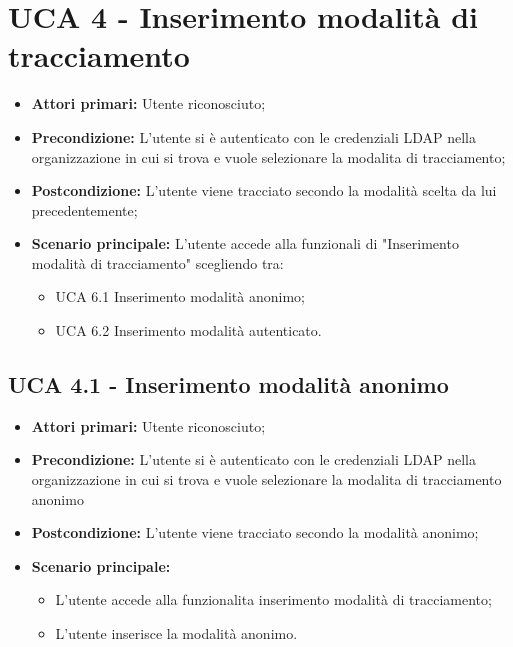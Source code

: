 \newpage
\section{UCA 4 - Inserimento modalità di tracciamento}%
\begin{itemize}
	\item \textbf{Attori primari:} Utente riconosciuto;
	\item \textbf{Precondizione:} L'utente si è autenticato con le credenziali LDAP nella organizzazione in cui si trova e vuole selezionare la modalita di tracciamento;
	\item \textbf{Postcondizione:} L'utente viene tracciato secondo la modalità scelta da lui precedentemente; 
	\item \textbf{Scenario principale:} L'utente accede alla funzionali di "Inserimento modalità di tracciamento" scegliendo tra:
	\begin{itemize}
		\item UCA 6.1 Inserimento modalità anonimo;
		\item UCA 6.2 Inserimento modalità autenticato.
	\end{itemize}
\end{itemize}

\subsection{UCA 4.1 - Inserimento modalità anonimo}%
\begin{itemize}
\item \textbf{Attori primari:} Utente riconosciuto;
\item \textbf{Precondizione:} L'utente si è autenticato con le credenziali LDAP nella organizzazione in cui si trova e vuole selezionare la modalita di tracciamento anonimo
\item \textbf{Postcondizione:}  L'utente viene tracciato secondo la modalità anonimo;
\item \textbf{Scenario principale:}
	\begin{itemize}
	\item L'utente accede alla funzionalita inserimento modalità di tracciamento;
	\item L'utente inserisce la modalità anonimo.
\end{itemize}
\end{itemize}

